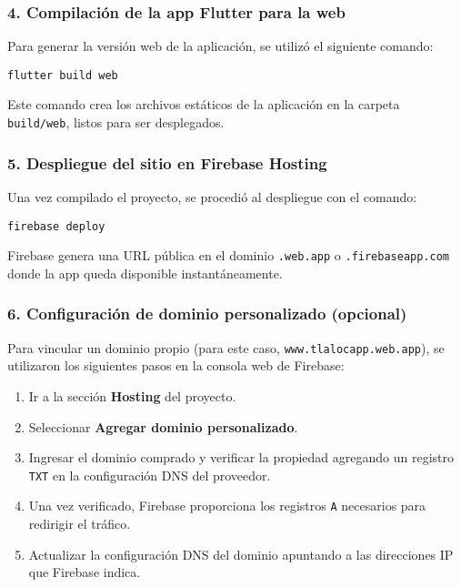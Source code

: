 \subsubsection{4. Compilación de la app Flutter para la web}

Para generar la versión web de la aplicación, se utilizó el siguiente comando:

\begin{verbatim}
flutter build web
\end{verbatim}

Este comando crea los archivos estáticos de la aplicación en la carpeta \texttt{build/web}, listos para ser desplegados.

\subsubsection{5. Despliegue del sitio en Firebase Hosting}

Una vez compilado el proyecto, se procedió al despliegue con el comando:

\begin{verbatim}
firebase deploy
\end{verbatim}

Firebase genera una URL pública en el dominio \texttt{.web.app} o \texttt{.firebaseapp.com} donde la app queda disponible instantáneamente.

\subsubsection{6. Configuración de dominio personalizado (opcional)}

Para vincular un dominio propio (para este caso, \texttt{www.tlalocapp.web.app}), se utilizaron los siguientes pasos en la consola web de Firebase:

\begin{enumerate}
    \item Ir a la sección \textbf{Hosting} del proyecto.
    \item Seleccionar \textbf{Agregar dominio personalizado}.
    \item Ingresar el dominio comprado y verificar la propiedad agregando un registro \texttt{TXT} en la configuración DNS del proveedor.
    \item Una vez verificado, Firebase proporciona los registros \texttt{A} necesarios para redirigir el tráfico.
    \item Actualizar la configuración DNS del dominio apuntando a las direcciones IP que Firebase indica.
\end{enumerate}

